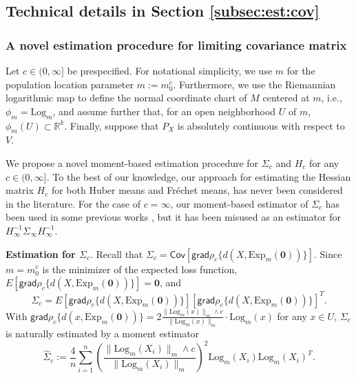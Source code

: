 \documentclass[preprint]{imsart}
\theoremstyle{plain}
\theoremstyle{remark}
\begin{document}
\begin{appendix}
\subsection{Technical details in Section \ref{subsec:est:cov}}

\subsubsection{A novel estimation procedure for limiting covariance matrix}
Let $c \in (0,\infty]$ be prespecified. For notational simplicity, we use $m$ for the population location parameter $m:= m_0^c$. Furthermore, we use the Riemannian logarithmic map to define the normal coordinate chart of $M$ centered at $m$, i.e., $\phi_m =  \mbox{Log}_m$, and assume further that, for an open neighborhood $U$ of $m$, $\phi_m(U) \subset \mathbb{R}^k$. Finally, suppose that $P_X$ is absolutely continuous with respect to $V$. 

We propose a novel moment-based estimation procedure for $\Sigma_c$ and $H_c$ for any $c \in (0,\infty]$. To the best of our knowledge, our approach for estimating the Hessian matrix $H_c$ for both Huber means and Fr\'{e}chet means, has never been considered in the literature. For the case of $c = \infty$, our moment-based estimator of $\Sigma_c$ has been used in some previous works \citep{hotz2015intrinsic, eltzner2019smeary, jung2025averaging}, but it has been misused as an estimator for $H^{-1}_{\infty}\Sigma_{\infty}H^{-1}_{\infty}$.

 
\textbf{Estimation for $\Sigma_c$}. 
Recall that $\Sigma_c = \textsf{Cov} [\textsf{grad} \rho_c\{ d(X, \mbox{Exp}_{m}(\mathbf{0}))\}]$. Since $m = m_{0}^{c}$ is the minimizer of the expected loss function, 
$E [\textsf{grad} \rho_c\{ d(X, \mbox{Exp}_{m}(\mathbf{0}))\} ] = \mathbf{0}$,  
and 
$$ 
\Sigma_c = 
E [ \textsf{grad} \rho_c\{ d(X, \mbox{Exp}_{m}(\mathbf{0}))\} ] [\textsf{grad} \rho_c\{ d(X, \mbox{Exp}_{m}(\mathbf{0}))\} ]^T.
$$
With $\textsf{grad} \rho_{c}\{ d(x, \mbox{Exp}_{m}(\mathbf{0}))\} = 2 \frac{\| \mbox{Log}_{m}(x) \|_{m} \wedge c}{\| \mbox{Log}_{m}(x) \|_{m}}\cdot \mbox{Log}_{m}(x)$ for any $x \in U$, $\Sigma_{c}$ is naturally estimated by a moment estimator
\begin{equation}
    \label{eq:Sigma_c_est}
    \hat{\Sigma}_{c}:=\frac{4}{n}\sum_{i=1}^n \left( \frac{\| \mbox{Log}_{m}(X_i) \|_{m} \wedge c}{\| \mbox{Log}_{m}(X_i) \|_{m}} \right)^2 \mbox{Log}_{m}(X_i) \mbox{Log}_{m}(X_i)^T.
\end{equation} 
 


\end{appendix}
\end{document}
